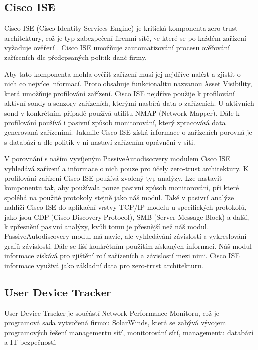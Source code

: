 \documentclass[thesis=B,czech,hidelinks]{FITthesis}[2019/03/21]
\begin{document}
        \subsection{Cisco ISE}
        Cisco ISE (Cisco Identity Services Engine) \cite{CiscoISEO} je kritická komponenta zero-trust architektury, což je typ zabezpečení firemní sítě, ve které se po každém zařízení vyžaduje ověření . Cisco ISE umožňuje zautomatizování procesu ověřování  zařízeních dle předepsaných politik dané firmy. 
        
        Aby tato komponenta mohla ověřit  zařízení musí jej nejdříve nalézt a zjistit o nich co nejvíce informací. Proto obsahuje funkcionalitu nazvanou Asset Visibility, která umožňuje profilování zařízení. Cisco ISE \cite{CiscoISED} nejdříve použije k profilování aktivní sondy a senzory zařízeních, kterými nasbírá data o zařízeních. U aktivních sond v konkrétním případě používá utilitu NMAP (Network Mapper). Dále k profilování používá i pasivní způsob monitorování, který zpracovává data generovaná zařízeními. Jakmile Cisco ISE získá informace o zařízeních porovná je s databází a dle politik v ní nastaví zařízením oprávnění v síti.
        
        V porovnání s naším vyvíjeným PassiveAutodiscovery modulem Cisco ISE vyhledává zařízení a informace o nich pouze pro účely zero-trust architektury. K profilování zařízení Cisco ISE používá zvolený typ analýzy. Lze nastavit komponentu tak, aby používala pouze pasivní způsob monitorování, při které spoléhá na použité protokoly stejně jako náš modul. Také v pasivní analýze nahlíží Cisco ISE do aplikační vrstvy TCP/IP modelu u specifických protokolů, jako jsou CDP (Cisco Discovery Protocol), SMB (Server Message Block) a další, k zpřesnění pasivní analýzy, kvůli tomu je přesnější než náš modul. PassiveAutodiscovery modul má navíc, ale vyhledávání závislostí a vykreslování grafů závislostí. Dále se liší konkrétním použitím získaných informací. Náš modul informace získává pro zjištění rolí zařízeních a závislostí mezi nimi. Cisco ISE informace využívá jako základní data pro zero-trust architekturu.
        
        \subsection{User Device Tracker}
        User Device Tracker je součástí Network Performance Monitoru, což je programová sada vytvořená firmou SolarWinds, která se zabývá vývojem programových řešení managementu sítí, monitorování sítí, managementu databází a IT bezpečností.
        
\end{document}

